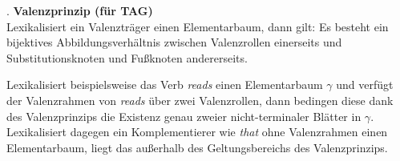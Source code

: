 \ex. {\bf Valenzprinzip (für TAG)} \label{ex-valenzprinzip-tag} \\
Lexikalisiert ein Valenzträger einen Elementarbaum, dann gilt: Es besteht ein bijektives Abbildungsverhältnis zwischen Valenzrollen einerseits und Substitutionsknoten und Fu\ss knoten andererseits.

Lexikalisiert beispielsweise das Verb {\it reads} einen Elementarbaum $\gamma$ und verfügt der Valenzrahmen von {\it reads} über zwei Valenzrollen, dann bedingen diese dank des Valenzprinzips die Existenz genau zweier nicht-terminaler Blätter in $\gamma$. Lexikalisiert dagegen ein Komplementierer wie {\it that} ohne Valenzrahmen einen Elementarbaum, liegt das außerhalb des Geltungsbereichs des Valenzprinzips.
  
